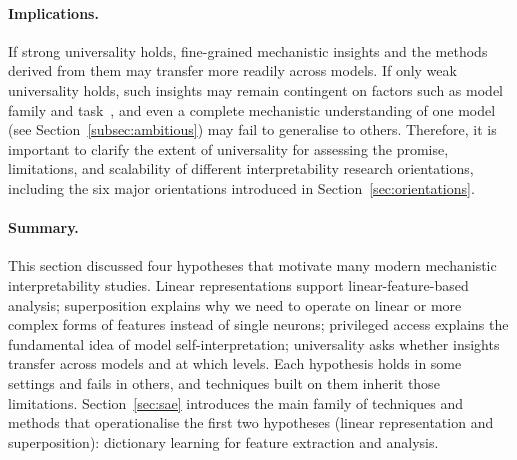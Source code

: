 \paragraph{Implications.}
If strong universality holds, fine-grained mechanistic insights and the methods derived from them may transfer more readily across models. If only weak universality holds, such insights may remain contingent on factors such as model family and task~, and even a complete mechanistic understanding of one model (see Section~\ref{subsec:ambitious}) may fail to generalise to others. Therefore, it is important to clarify the extent of universality for assessing the promise, limitations, and scalability of different interpretability research orientations, including the six major orientations introduced in Section~\ref{sec:orientations}.

\paragraph{Summary.} This section discussed four hypotheses that motivate many modern mechanistic interpretability studies. Linear representations support linear-feature-based analysis; superposition explains why we need to operate on linear or more complex forms of features instead of single neurons; privileged access explains the fundamental idea of model self-interpretation; universality asks whether insights transfer across models and at which levels. Each hypothesis holds in some settings and fails in others, and techniques built on them inherit those limitations. Section~\ref{sec:sae} introduces the main family of techniques and methods that operationalise the first two hypotheses (linear representation and superposition): dictionary learning for feature extraction and analysis.
